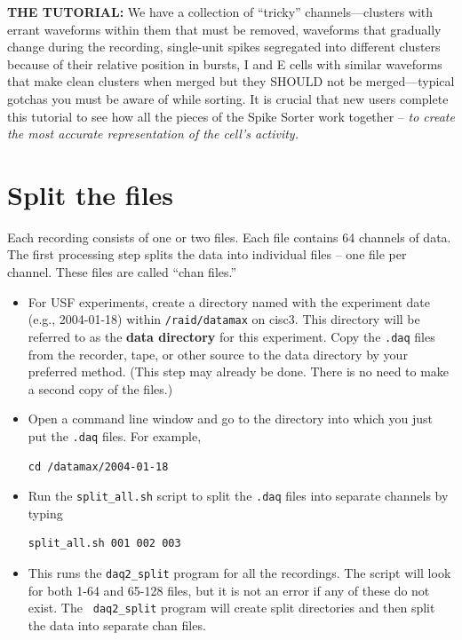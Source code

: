 \documentclass[12pt]{article}
\begin{document}
\textbf{THE TUTORIAL:} We have a collection of ``tricky''
channels---clusters with errant waveforms within them that must be
removed, waveforms that gradually change during the recording,
single-unit spikes segregated into different clusters because of their
relative position in bursts, I and E cells with similar waveforms that
make clean clusters when merged but they SHOULD not be
merged{}---typical gotchas you must be aware of while sorting. It is
crucial that new users complete this tutorial to see how all the
pieces of the Spike Sorter work together -- \textit{to create the most
  accurate representation of the cell's activity.}

\section {Split the files}

Each recording consists of one or two files. Each file contains 64
channels of data. The first processing step splits the data into
individual files -- one file per channel. These files are called
``chan files.''

\begin{itemize}
\item For USF experiments, create a directory named with the
  experiment date (e.g., 2004-01-18) within {\tt /raid/datamax} on
  cisc3.  This directory will be referred to as the \textbf{data
    directory} for this experiment. Copy the {\tt .daq} files from the
  recorder, tape, or other source to the data directory by your
  preferred method. (This step may already be done. There is no need
  to make a second copy of the files.)
\item Open a command line window and go to the directory into which
  you just put the {\tt .daq} files. For example,
  \begin{verbatim}
cd /datamax/2004-01-18
  \end{verbatim}
\item Run the {\tt split\_all.sh} script to split the {\tt .daq} files
  into separate channels by typing
  \begin{verbatim}
split_all.sh 001 002 003
  \end{verbatim}
\item This runs the {\tt daq2\_split} program for all the
  recordings. The script will look for both 1-64 and 65-128 files, but
  it is not an error if any of these do not exist. The {\tt
    daq2\_split} program will create split directories and then split
  the data into separate chan files.
\end{itemize}
\end{document}
